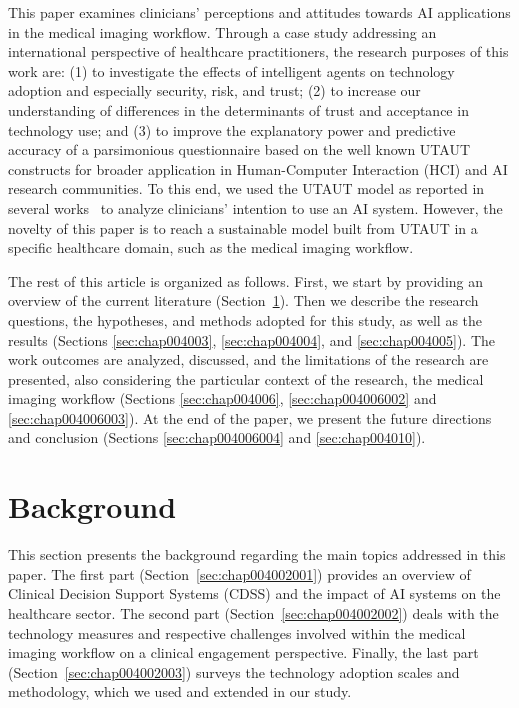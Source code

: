 This paper examines clinicians' perceptions and attitudes towards AI applications in the medical imaging workflow.
Through a case study addressing an international perspective of healthcare practitioners, the research purposes of this work are:
(1) to investigate the effects of intelligent agents on technology adoption and especially security, risk, and trust;
(2) to increase our understanding of differences in the determinants of trust and acceptance in technology use; and
(3) to improve the explanatory power and predictive accuracy of a parsimonious questionnaire based on the well known UTAUT constructs for broader application in Human-Computer Interaction (HCI) and AI research communities.
To this end, we used the UTAUT model as reported in several works~\cite{BOOTSMAN201999, DEANGELI2020102412, HART201993, HOEHLE201635, LOOIJE2010386, MCGLYNN201733, MOORE2022102784} to analyze clinicians' intention to use an AI system.
However, the novelty of this paper is to reach a sustainable model built from UTAUT in a specific healthcare domain, such as the medical imaging workflow.

The rest of this article is organized as follows.
First, we start by providing an overview of the current literature (Section~\ref{sec:chap004002}).
Then we describe the research questions, the hypotheses, and methods adopted for this study, as well as the results (Sections \ref{sec:chap004003}, \ref{sec:chap004004}, and \ref{sec:chap004005}).
The work outcomes are analyzed, discussed, and the limitations of the research are presented, also considering the particular context of the research, the medical imaging workflow (Sections \ref{sec:chap004006}, \ref{sec:chap004006002} and \ref{sec:chap004006003}).
At the end of the paper, we present the future directions and conclusion (Sections \ref{sec:chap004006004} and \ref{sec:chap004010}).

\section{Background}
\label{sec:chap004002}

This section presents the background regarding the main topics addressed in this paper.
The first part (Section~\ref{sec:chap004002001}) provides an overview of Clinical Decision Support Systems (CDSS) and the impact of AI systems on the healthcare sector.
The second part (Section~\ref{sec:chap004002002}) deals with the technology measures and respective challenges involved within the medical imaging workflow on a clinical engagement perspective.
Finally, the last part (Section~\ref{sec:chap004002003}) surveys the technology adoption scales and methodology, which we used and extended in our study.

